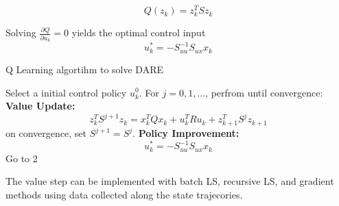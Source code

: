 \documentclass[conference]{IEEEtran}
\begin{document}
\[Q(z_k) = z^T_kSz_k\]

Solving \(\frac{\partial{Q}}{\partial{u_k}} = 0\) yields the optimal control input
\[u^{*}_k = -S^{-1}_{uu}S_{ux}x_k\]
\begin{algorithm}
	\caption{Q Learning algortihm to solve DARE}
	\label{alg:qdtlqr}
	\begin{algorithmic}[1]
		\STATE Select a initial control policy \(u^0_k\).
		\STATE For \(j=0,1, ...\), perfrom until convergence: \\
		\textbf{Value Update:}
		\[
		z^T_kS^{j+1}z_k = x^T_kQx_k + u^T_kRu_k + z^T_{k+1}S^{j}z_{k+1}\]
		on convergence, set \(S^{j+1}=S^j\).
		\STATE \textbf{Policy Improvement:}
		\[u^{*}_k = -S^{-1}_{uu}S_{ux}x_k\]
		\STATE Go to 2
	\end{algorithmic}
\end{algorithm}
The value step can be implemented with batch LS, recursive LS, and gradient methods using data collected along the state trajecories.
\end{document}
